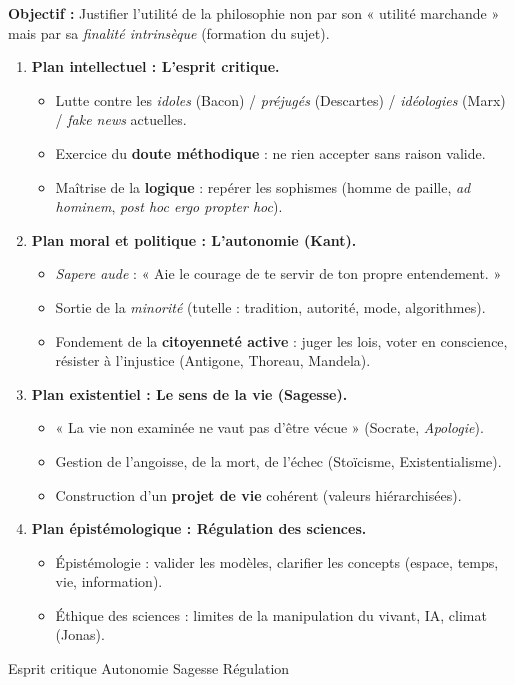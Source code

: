 \documentclass[11pt]{article}
\newcommand{\cle}[1]{{\popxbold\color{popdark}#1}}
\begin{document}
\begin{methode}
\textbf{Objectif :} Justifier l'utilité de la philosophie non par son « utilité marchande » mais par sa \emph{finalité intrinsèque} (formation du sujet).
\begin{enumerate}
    \item \textbf{Plan intellectuel : L'esprit critique.}
    \begin{itemize}
        \item Lutte contre les \emph{idoles} (Bacon) / \emph{préjugés} (Descartes) / \emph{idéologies} (Marx) / \emph{fake news} actuelles.
        \item Exercice du \textbf{doute méthodique} : ne rien accepter sans raison valide.
        \item Maîtrise de la \textbf{logique} : repérer les sophismes (homme de paille, \emph{ad hominem}, \emph{post hoc ergo propter hoc}).
    \end{itemize}
    \item \textbf{Plan moral et politique : L'autonomie (Kant).}
    \begin{itemize}
        \item \emph{Sapere aude} : « Aie le courage de te servir de ton propre entendement. »
        \item Sortie de la \emph{minorité} (tutelle : tradition, autorité, mode, algorithmes).
        \item Fondement de la \textbf{citoyenneté active} : juger les lois, voter en conscience, résister à l'injustice (Antigone, Thoreau, Mandela).
    \end{itemize}
    \item \textbf{Plan existentiel : Le sens de la vie (Sagesse).}
    \begin{itemize}
        \item « La vie non examinée ne vaut pas d'être vécue » (Socrate, \emph{Apologie}).
        \item Gestion de l'angoisse, de la mort, de l'échec (Stoïcisme, Existentialisme).
        \item Construction d'un \textbf{projet de vie} cohérent (valeurs hiérarchisées).
    \end{itemize}
    \item \textbf{Plan épistémologique : Régulation des sciences.}
    \begin{itemize}
        \item Épistémologie : valider les modèles, clarifier les concepts (espace, temps, vie, information).
        \item Éthique des sciences : limites de la manipulation du vivant, IA, climat (Jonas).
    \end{itemize}
\end{enumerate}
\cle{Esprit critique} \cle{Autonomie} \cle{Sagesse} \cle{Régulation}
\end{methode}
\end{document}
